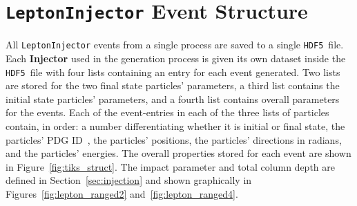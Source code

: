 \documentclass[main.tex]{subfiles}
\newcommand{\LeptonInjector}{\texttt{LeptonInjector}}
\newcommand{\hdf}{\texttt{HDF5}}
\begin{document}
\iffalse
\section{\LeptonInjector{} Event Structure~\label{sec:li_event}}

All \LeptonInjector{} events from a single process are saved to a single \hdf~file. Each \textbf{Injector} used in the generation process is given its own dataset inside the \hdf~file with four lists containing an entry for each event generated. Two lists are stored for the two final state particles' parameters, a third list contains the initial state particles' parameters, and a fourth list contains overall parameters for the events.
Each of the event-entries in each of the three lists of particles contain, in order: a number differentiating whether it is initial or final state, the particles' PDG ID~\cite{PhysRevD.98.030001}, the particles' positions, the particles' directions in radians, and the particles' energies. 
The overall properties stored for each event are shown in Figure~\ref{fig:tiks_struct}.
The impact parameter and total column depth are defined in Section~\ref{sec:injection} and shown graphically in Figures~\ref{fig:lepton_ranged2} and~\ref{fig:lepton_ranged4}.
\end{document}
